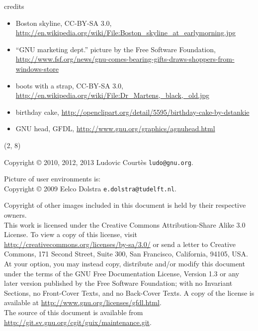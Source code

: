 \documentclass{beamer}
\begin{document}
\begin{frame}{credits}
  \small{
  \begin{itemize}
  \item Boston skyline, CC-BY-SA 3.0,
    \url{http://en.wikipedia.org/wiki/File:Boston_skyline_at_earlymorning.jpg}
  \item ``GNU marketing dept.'' picture by the Free Software Foundation,
    \url{http://www.fsf.org/news/gnu-comes-bearing-gifts-draws-shoppers-from-windows-store}
  \item boots with a strap, CC-BY-SA 3.0,
    \url{http://en.wikipedia.org/wiki/File:Dr_Martens,_black,_old.jpg}
  \item birthday cake,
    \url{http://openclipart.org/detail/5595/birthday-cake-by-dstankie}
  \item GNU head, GFDL, \url{http://www.gnu.org/graphics/agnuhead.html}
  \end{itemize}
  }
\end{frame}

\begin{frame}{}

  \begin{textblock}{12}(2, 8)
    \tiny{
      Copyright \copyright{} 2010, 2012, 2013 Ludovic Courtès \texttt{ludo@gnu.org}.

      Picture of user environments is: \\
      Copyright \copyright{} 2009 Eelco Dolstra \texttt{e.dolstra@tudelft.nl}.

      Copyright of other images included in this document is held by
      their respective owners.
      \\[3.0mm]
      This work is licensed under the \alert{Creative Commons
        Attribution-Share Alike 3.0} License.  To view a copy of this
      license, visit
      \url{http://creativecommons.org/licenses/by-sa/3.0/} or send a
      letter to Creative Commons, 171 Second Street, Suite 300, San
      Francisco, California, 94105, USA.
      \\[2.0mm]
      At your option, you may instead copy, distribute and/or modify
      this document under the terms of the \alert{GNU Free Documentation
        License, Version 1.3 or any later version} published by the Free
      Software Foundation; with no Invariant Sections, no Front-Cover
      Texts, and no Back-Cover Texts.  A copy of the license is
      available at \url{http://www.gnu.org/licenses/gfdl.html}.
      \\[2.0mm]
      The source of this document is available from
      \url{http://git.sv.gnu.org/cgit/guix/maintenance.git}.
    }
  \end{textblock}
\end{frame}
\end{document}
